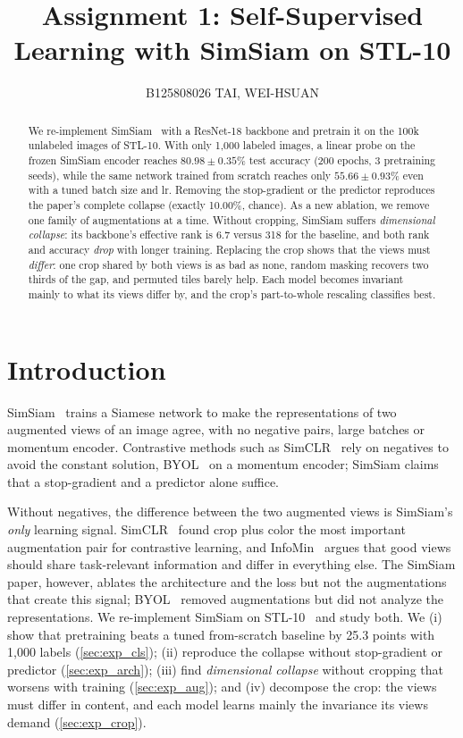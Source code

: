 \documentclass[10pt,twocolumn,letterpaper]{article}
\title{Assignment 1: Self-Supervised Learning with SimSiam on STL-10}
\author{B125808026 TAI, WEI-HSUAN}
\begin{document}
\maketitle

\begin{abstract}
We re-implement SimSiam~\cite{chen2021simsiam} with a ResNet-18 backbone and pretrain it on the 100k unlabeled images of STL-10.
With only 1,000 labeled images, a linear probe on the frozen SimSiam encoder reaches $80.98\pm0.35\%$ test accuracy (200 epochs, 3 pretraining seeds), while the same network trained from scratch reaches only $55.66\pm0.93\%$ even with a tuned batch size and lr.
Removing the stop-gradient or the predictor reproduces the paper's complete collapse (exactly 10.00\%, chance).
As a new ablation, we remove one family of augmentations at a time. Without cropping, SimSiam suffers \emph{dimensional collapse}: its backbone's effective rank is 6.7 versus 318 for the baseline, and both rank and accuracy \emph{drop} with longer training.
Replacing the crop shows that the views must \emph{differ}: one crop shared by both views is as bad as none, random masking recovers two thirds of the gap, and permuted tiles barely help. Each model becomes invariant mainly to what its views differ by, and the crop's part-to-whole rescaling classifies best.
\end{abstract}

\section{Introduction}
\label{sec:intro}

SimSiam~\cite{chen2021simsiam} trains a Siamese network to make the representations of two augmented views of an image agree, with no negative pairs, large batches or momentum encoder.
Contrastive methods such as SimCLR~\cite{chen2020simclr} rely on negatives to avoid the constant solution, BYOL~\cite{grill2020byol} on a momentum encoder; SimSiam claims that a stop-gradient and a predictor alone suffice.

Without negatives, the difference between the two augmented views is SimSiam's \emph{only} learning signal.
SimCLR~\cite{chen2020simclr} found crop plus color the most important augmentation pair for contrastive learning, and InfoMin~\cite{tian2020infomin} argues that good views should share task-relevant information and differ in everything else.
The SimSiam paper, however, ablates the architecture and the loss but not the augmentations that create this signal; BYOL~\cite{grill2020byol} removed augmentations but did not analyze the representations.
We re-implement SimSiam on STL-10~\cite{coates2011stl10} and study both.
We (i) show that pretraining beats a tuned from-scratch baseline by 25.3 points with 1,000 labels (\cref{sec:exp_cls}); (ii) reproduce the collapse without stop-gradient or predictor (\cref{sec:exp_arch}); (iii) find \emph{dimensional collapse} without cropping that worsens with training (\cref{sec:exp_aug}); and (iv) decompose the crop: the views must differ in content, and each model learns mainly the invariance its views demand (\cref{sec:exp_crop}).
\end{document}
